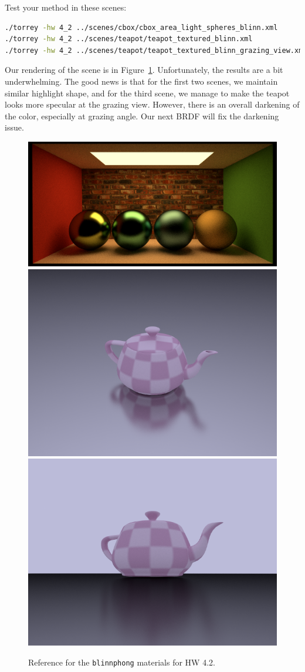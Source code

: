 Test your method in these scenes:
\begin{lstlisting}[language=bash]
./torrey -hw 4_2 ../scenes/cbox/cbox_area_light_spheres_blinn.xml
./torrey -hw 4_2 ../scenes/teapot/teapot_textured_blinn.xml
./torrey -hw 4_2 ../scenes/teapot/teapot_textured_blinn_grazing_view.xml
\end{lstlisting}
Our rendering of the scene is in Figure~\ref{fig:hw_4_2_blinn}. Unfortunately, the results are a bit underwhelming. The good news is that for the first two scenes, we maintain similar highlight shape, and for the third scene, we manage to make the teapot looks more specular at the grazing view. However, there is an overall darkening of the color, especially at grazing angle. Our next BRDF will fix the darkening issue.

\begin{figure}[ht]
    \centering
    \includegraphics[width=0.45\linewidth]{imgs/hw_4_2f.png}
    \includegraphics[width=0.225\linewidth]{imgs/hw_4_2g.png}
    \includegraphics[width=0.225\linewidth]{imgs/hw_4_2h.png}
    \caption{Reference for the \lstinline{blinnphong} materials for HW 4.2.}
    \label{fig:hw_4_2_blinn}
\end{figure}

